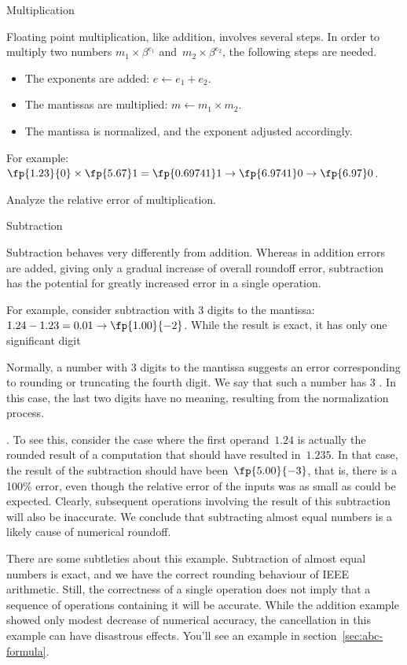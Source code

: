  {Multiplication}

Floating point multiplication, like addition, involves several steps.
In order to multiply two numbers $m_1\times\beta^{e_1}$
and~$m_2\times\beta^{e_2}$, the following steps are needed.
\begin{itemize}
\item The exponents are added: $e\leftarrow e_1+e_2$.
\item The mantissas are multiplied: $m\leftarrow
  m_1\times m_2$.
\item The mantissa is normalized, and the exponent adjusted accordingly.
\end{itemize}

For example: $\fp{1.23}{0}\times\fp{5.67}1=\fp{0.69741}1\rightarrow
\fp{6.9741}0\rightarrow\fp{6.97}0$.

\begin{exercise}
  Analyze the relative error of multiplication.
\end{exercise}

 {Subtraction}
\label{sec:subtraction}

Subtraction behaves very differently from addition. Whereas in
addition errors are added, giving only a gradual increase of overall
roundoff error, subtraction has the potential for greatly increased
error in a single operation. 

For example, consider subtraction with 3 digits to the mantissa:
$1.24-1.23=0.01\rightarrow \fp{1.00}{-2}$. While the result is exact,
it has only one significant digit
\begin{footnoteenv}
  {Normally, a number with 3
  digits to the mantissa suggests an error corresponding to rounding
  or truncating the fourth digit. We say that such a number has 3
  . In this case, the last two digits have no
  meaning, resulting from the normalization process.}
\end{footnoteenv}
. To see this, consider
the case where the first operand~$1.24$ is actually the rounded result
of a computation that should have resulted in~$1.235$. In that case,
the result of the subtraction should have been~$\fp{5.00}{-3}$, that
is, there is a 100\% error, even though the relative error of the
inputs was as small as could be expected. Clearly, subsequent
operations involving the result of this subtraction will also be
inaccurate.
We conclude that subtracting almost equal numbers is a likely cause of
numerical roundoff.

There are some subtleties about this example. Subtraction of almost
equal numbers is exact, and we have the correct rounding behaviour of
IEEE arithmetic. Still, the correctness of a single operation does not
imply that a sequence of operations containing it will be
accurate. While the addition example showed only modest decrease of
numerical accuracy, the cancellation in this example can have
disastrous effects. You'll see an example in section~\ref{sec:abc-formula}.

